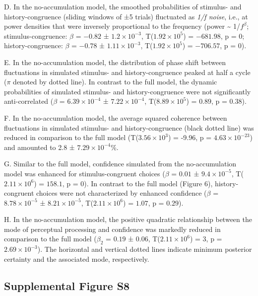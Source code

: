 \documentclass[
]{article}
\begin{document}
D. In the no-accumulation model, the smoothed probabilities of stimulus-
and history-congruence (sliding windows of ±5 trials) fluctuated as
\emph{1/f noise}, i.e., at power densities that were inversely
proportional to the frequency (power \textasciitilde{} 1/\(f^\beta\);
stimulus-congruence: \(\beta\) = \(-0.82\) ±
\(\ensuremath{1.2\times 10^{-3}}\),
T(\(\ensuremath{1.92\times 10^{5}}\)) = \(-681.98\), p = \(0\);
history-congruence: \(\beta\) = \(-0.78\) ±
\(\ensuremath{1.11\times 10^{-3}}\),
T(\(\ensuremath{1.92\times 10^{5}}\)) = \(-706.57\), p = \(0\)).

E. In the no-accumulation model, the distribution of phase shift between
fluctuations in simulated stimulus- and history-congruence peaked at
half a cycle (\(\pi\) denoted by dotted line). In contrast to the full
model, the dynamic probabilities of simulated stimulus- and
history-congruence were not significantly anti-correlated (\(\beta\) =
\(\ensuremath{6.39\times 10^{-4}}\) ±
\(\ensuremath{7.22\times 10^{-4}}\),
T(\(\ensuremath{8.89\times 10^{5}}\)) = \(0.89\), p = \(0.38\)).

F. In the no-accumulation model, the average squared coherence between
fluctuations in simulated stimulus- and history-congruence (black dotted
line) was reduced in comparison to the full model
(T(\ensuremath{3.56\times 10^{3}}) = -9.96, p =
\(\ensuremath{4.63\times 10^{-23}}\)) and amounted to 2.8 ±
\ensuremath{7.29\times 10^{-4}}\%.

G. Similar to the full model, confidence simulated from the
no-accumulation model was enhanced for stimulus-congruent choices
(\(\beta\) = \(0.01\) ± \(\ensuremath{9.4\times 10^{-5}}\),
T(\(\ensuremath{2.11\times 10^{6}}\)) = \(158.1\), p = \(0\)). In
contrast to the full model (Figure 6), history-congruent choices were
not characterized by enhanced confidence (\(\beta\) =
\(\ensuremath{8.78\times 10^{-5}}\) ±
\(\ensuremath{8.21\times 10^{-5}}\),
T(\(\ensuremath{2.11\times 10^{6}}\)) = \(1.07\), p = \(0.29\)).

H. In the no-accumulation model, the positive quadratic relationship
between the mode of perceptual processing and confidence was markedly
reduced in comparison to the full model (\(\beta_2\) = \(0.19\) ±
\(0.06\), T(\(\ensuremath{2.11\times 10^{6}}\)) = \(3\), p =
\(\ensuremath{2.69\times 10^{-3}}\)). The horizontal and vertical dotted
lines indicate minimum posterior certainty and the associated mode,
respectively.

\newpage

\hypertarget{supplemental-figure-s8}{%
\subsection{Supplemental Figure S8}\label{supplemental-figure-s8}}
\end{document}
